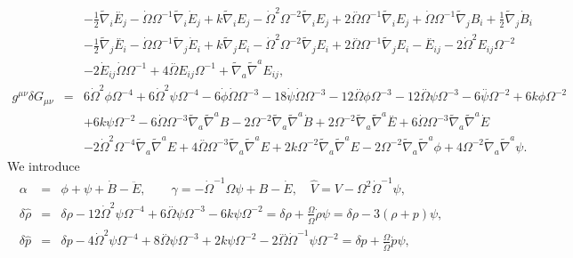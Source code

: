 \documentclass[aps,onecolumn,10pt]{revtex4}
\numberwithin{equation}{section}
\numberwithin{equation}{section}
\begin{document}
\begin{eqnarray}
\nonumber \\ 
&& -  \tfrac{1}{2} \tilde{\nabla}_{i}\overset{..}{E}_{j} -  \dot{\Omega} \Omega^{-1} \tilde{\nabla}_{i}\dot{E}_{j} + k \tilde{\nabla}_{i}E_{j} -  \dot{\Omega}^2 \Omega^{-2} \tilde{\nabla}_{i}E_{j} + 2 \overset{..}{\Omega} \Omega^{-1} \tilde{\nabla}_{i}E_{j} + \dot{\Omega} \Omega^{-1} \tilde{\nabla}_{j}B_{i} + \tfrac{1}{2} \tilde{\nabla}_{j}\dot{B}_{i} \nonumber \\ 
&& -  \tfrac{1}{2} \tilde{\nabla}_{j}\overset{..}{E}_{i} -  \dot{\Omega} \Omega^{-1} \tilde{\nabla}_{j}\dot{E}_{i} + k \tilde{\nabla}_{j}E_{i} -  \dot{\Omega}^2 \Omega^{-2} \tilde{\nabla}_{j}E_{i} + 2 \overset{..}{\Omega} \Omega^{-1} \tilde{\nabla}_{j}E_{i}- \overset{..}{E}_{ij} - 2 \dot{\Omega}^2 E_{ij} \Omega^{-2} \nonumber \\ 
&& - 2 \dot{E}_{ij} \dot{\Omega} \Omega^{-1} + 4 \overset{..}{\Omega} E_{ij} \Omega^{-1} + \tilde{\nabla}_{a}\tilde{\nabla}^{a}E_{ij},
 \nonumber\\
g^{\mu\nu}\delta G_{\mu\nu} &=& 6 \dot{\Omega}^2 \phi \Omega^{-4} + 6 \dot{\Omega}^2 \psi \Omega^{-4} - 6 \dot{\phi} \dot{\Omega} \Omega^{-3} - 18 \dot{\psi} \dot{\Omega} \Omega^{-3} - 12 \overset{..}{\Omega} \phi \Omega^{-3} - 12 \overset{..}{\Omega} \psi \Omega^{-3} - 6 \overset{..}{\psi} \Omega^{-2} + 6 k \phi \Omega^{-2} \nonumber \\ 
&& + 6 k \psi \Omega^{-2} - 6 \dot{\Omega} \Omega^{-3} \tilde{\nabla}_{a}\tilde{\nabla}^{a}B - 2 \Omega^{-2} \tilde{\nabla}_{a}\tilde{\nabla}^{a}\dot{B} + 2 \Omega^{-2} \tilde{\nabla}_{a}\tilde{\nabla}^{a}\overset{..}{E} + 6 \dot{\Omega} \Omega^{-3} \tilde{\nabla}_{a}\tilde{\nabla}^{a}\dot{E} \nonumber \\ 
&& - 2 \dot{\Omega}^2 \Omega^{-4} \tilde{\nabla}_{a}\tilde{\nabla}^{a}E + 4 \overset{..}{\Omega} \Omega^{-3} \tilde{\nabla}_{a}\tilde{\nabla}^{a}E + 2 k \Omega^{-2} \tilde{\nabla}_{a}\tilde{\nabla}^{a}E - 2 \Omega^{-2} \tilde{\nabla}_{a}\tilde{\nabla}^{a}\phi + 4 \Omega^{-2} \tilde{\nabla}_{a}\tilde{\nabla}^{a}\psi. 
\label{9.11}
\end{eqnarray}
%
We introduce
%
\begin{eqnarray}
\alpha  &=& \phi + \psi + \dot B - \ddot E,\qquad \gamma = - \dot\Omega^{-1}\Omega \psi + B - \dot E,\quad \hat{V} = V-\Omega^2 \dot \Omega^{-1}\psi,
 \nonumber\\
\delta \hat{\rho}&=&\delta \rho - 12 \dot{\Omega}^2 \psi \Omega^{-4} + 6 \overset{..}{\Omega} \psi \Omega^{-3} - 6 k \psi \Omega^{-2}=\delta\rho +\frac{\Omega}{\dot{\Omega}}\dot{\rho}\psi=\delta \rho-3(\rho+p)\psi,
\nonumber\\
\delta \hat{p}&=&\delta p - 4 \dot{\Omega}^2 \psi \Omega^{-4} + 8 \overset{..}{\Omega} \psi \Omega^{-3} + 2 k \psi \Omega^{-2} - 2 \overset{...}{\Omega} \dot{\Omega}^{-1} \psi \Omega^{-2}=\delta p +\frac{\Omega}{\dot{\Omega}}\dot{p}\psi,
\label{9.12}
\end{eqnarray}
\end{document}
